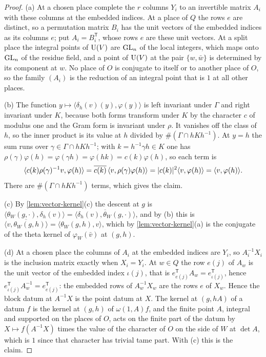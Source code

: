 \begin{proof}
(a) At a chosen place complete the $r$ columns $Y_i$ to an invertible matrix $A_i$ with these columns at the embedded indices. At a place of $Q$ the rows $e$ are distinct, so a permutation matrix
$B_i$ has the unit vectors of the embedded indices as its columns $e$; put $A_i=B_i^{\mathsf T}$, whose rows $e$ are these unit vectors. At a split place the integral points of $\operatorname{U}(V)$ are $\operatorname{GL}_n$ of the local
integers, which maps onto $\operatorname{GL}_n$ of the residue field, and a point of $\operatorname{U}(V)$ at the pair $\{w,\bar w\}$ is determined by its component at $w$. No place of $O$ is conjugate to itself or to another place of $O$,
so the family $(A_i)$ is the reduction of an integral point that is $1$ at all other places.

(b) The function $y\mapsto\langle\delta_h(v)(y),\varphi(y)\rangle$ is left invariant under $\Gamma$ and right invariant under $K$, because both forms transform under $K$ by the character $c$ of modulus one and the
Gram form is invariant under $\rho$. It vanishes off the class of $h$, so the inner product is its value at $h$ divided by $\#(\Gamma\cap hKh^{-1})$. At $y=h$ the sum runs over $\gamma\in\Gamma\cap hKh^{-1}$; with
$k=h^{-1}\gamma h\in K$ one has $\rho(\gamma)\varphi(h)=\varphi(\gamma h)=\varphi(hk)=c(k)\varphi(h)$, so each term is
\[
  \langle c(k)\rho(\gamma)^{-1}v,\varphi(h)\rangle=\overline{c(k)}\,\langle v,\rho(\gamma)\varphi(h)\rangle=\lvert c(k)\rvert^2\langle v,\varphi(h)\rangle=\langle v,\varphi(h)\rangle.
\]
There are $\#(\Gamma\cap hKh^{-1})$ terms, which gives the claim.

(c) By \cref{lem:vector-kernel}(c) the descent at $g$ is $\langle\theta_W(g,\cdot),\delta_h(v)\rangle=\overline{\langle\delta_h(v),\theta_W(g,\cdot)\rangle}$, and by (b) this is $\overline{\langle v,\theta_W(g,h)\rangle}=\langle\theta_W(g,h),v\rangle$, which by
\cref{lem:vector-kernel}(a) is the conjugate of the theta kernel of $\varphi_W(\bar v)$ at $(g,h)$.

(d) At a chosen place the columns of $A_i$ at the embedded indices are $Y_i$, so $A_i^{-1}X_i$ is the inclusion matrix exactly when $X_i=Y_i$. At $w\in Q$ the row $e(j)$ of $A_w$ is the unit vector of the
embedded index $\iota(j)$, that is $e_{e(j)}^{\mathsf T}A_w=e_{\iota(j)}^{\mathsf T}$, hence $e_{\iota(j)}^{\mathsf T}A_w^{-1}=e_{e(j)}^{\mathsf T}$: the embedded rows of $A_w^{-1}X_w$ are the rows $e$ of $X_w$. Hence the block datum at $A^{-1}X$ is the point
datum at $X$. The kernel at $(g,hA)$ of a datum $f$ is the kernel at $(g,h)$ of $\omega(1,A)f$, and the finite point $A$, integral and supported on the places of $O$, acts on the finite part of the datum by
$X\mapsto f(A^{-1}X)$ times the value of the character of $O$ on the side of $W$ at $\det A$, which is $1$ since that character has trivial tame part. With (c) this is the claim.
\end{proof}

